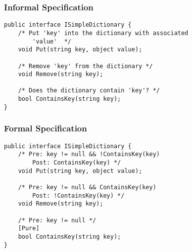 \begin{frame}[fragile]
    \frametitle{Informal Specification}
    \begin{verbatim}
public interface ISimpleDictionary {
    /* Put 'key' into the dictionary with associated
        'value'  */
    void Put(string key, object value);

    /* Remove 'key' from the dictionary */
    void Remove(string key);

    /* Does the dictionary contain 'key'? */
    bool ContainsKey(string key);
}
    \end{verbatim}
\end{frame}

\begin{frame}[fragile]
    \frametitle{Formal Specification}
    \begin{verbatim}
public interface ISimpleDictionary {
    /* Pre: key != null && !ContainsKey(key)
        Post: ContainsKey(key) */
    void Put(string key, object value);

    /* Pre: key != null && ContainsKey(key)
        Post: !ContainsKey(key) */
    void Remove(string key);

    /* Pre: key != null */
    [Pure]
    bool ContainsKey(string key);
}
    \end{verbatim}
\end{frame}
